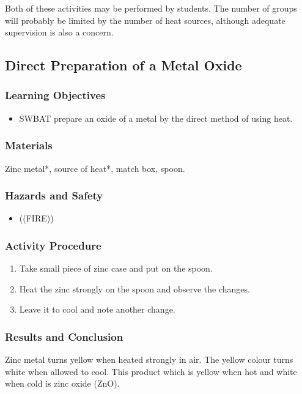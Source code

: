 Both of these activities may be performed by students. The number of groups will probably be limited by the number of heat sources, although adequate supervision is also a concern.

\subsection{Direct Preparation of a Metal Oxide}

\subsubsection*{Learning Objectives}
\begin{itemize}
\item{SWBAT prepare an oxide of a metal by the direct method of using heat.}
\end{itemize}

\subsubsection*{Materials}
Zinc metal*, source of heat*, match box, spoon.

\subsubsection*{Hazards and Safety}
\begin{itemize}
\item{((FIRE))}
\end{itemize}

\subsubsection*{Activity Procedure}
\begin{enumerate}
\item{Take small piece of zinc case and put on the spoon.}
\item{Heat the zinc strongly on the spoon and observe the changes.}
\item{Leave it to cool and note another change.}
\end{enumerate}

\subsubsection*{Results and Conclusion}
Zinc metal turns yellow when heated strongly in air. The yellow colour turns white when allowed to cool. This product which is yellow when hot and white when cold is zinc oxide (ZnO).

